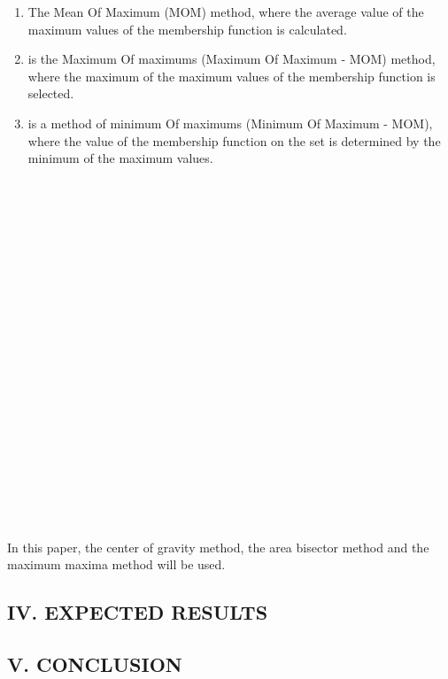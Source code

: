 \documentclass{article}
\begin{document}
\begin{minipage}{0.49\textwidth}
\begin{enumerate}
            \item The Mean Of Maximum (MOM) method, where the average value of the maximum values of the membership function is calculated.
            \item is the Maximum Of maximums (Maximum Of Maximum - MOM) method, where the maximum of the maximum values of the membership function is selected.
            \item is a method of minimum Of maximums (Minimum Of Maximum - MOM), where the value of the membership function on the set is determined by the minimum of the maximum values.
        \end{enumerate}

        ~\\
            ~\\
            ~\\
            ~\\
            ~\\
            ~\\
            ~\\
            ~\\
            ~\\
            ~\\
            ~\\
            ~\\
            ~\\
            ~\\
            ~\\
            ~\\
            ~\\
            ~\\
            ~\\
            ~\\
    \end{minipage}
    \hfill
    \begin{minipage}{0.49\textwidth}
        In this paper, the center of gravity method, the area bisector method and the maximum maxima method will be used.
        \begin{center}
            \chapter{IV. EXPECTED RESULTS}
        \end{center}
    \end{minipage}
\newpage
    \begin{minipage}{0.49\textwidth}
        \begin{center}
            \chapter{V. CONCLUSION}
        \end{center}
    \end{minipage}
\end{document}
